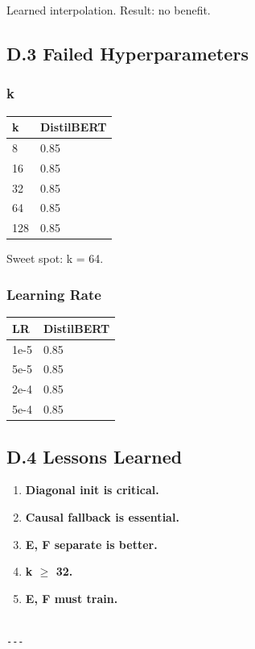 Learned interpolation. Result: no benefit.

\subsection{D.3 Failed Hyperparameters}

\subsubsection{k}

\begin{table}[H]
\centering
\small
\begin{tabular}{ll}
\toprule
\textbf{k} & \textbf{DistilBERT} \\
\midrule
8 & 0.85 \\
16 & 0.85 \\
32 & 0.85 \\
64 & 0.85 \\
128 & 0.85 \\
\bottomrule
\end{tabular}
\end{table}

Sweet spot: k = 64.

\subsubsection{Learning Rate}

\begin{table}[H]
\centering
\small
\begin{tabular}{ll}
\toprule
\textbf{LR} & \textbf{DistilBERT} \\
\midrule
1e-5 & 0.85 \\
5e-5 & 0.85 \\
2e-4 & 0.85 \\
5e-4 & 0.85 \\
\bottomrule
\end{tabular}
\end{table}

\subsection{D.4 Lessons Learned}

\begin{enumerate}
\item \textbf{Diagonal init is critical.}
\item \textbf{Causal fallback is essential.}
\item \textbf{E, F separate is better.}
\item \textbf{k $\ge$ 32.}
\item \textbf{E, F must train.}
\end{enumerate}
\begin{lstlisting}

---
\end{lstlisting}

